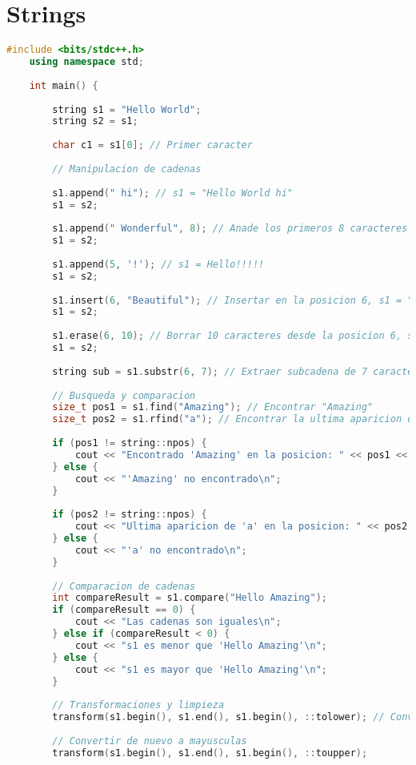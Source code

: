 
\section*{Strings}

\begin{lstlisting}[language=C++]
	#include <bits/stdc++.h>
	using namespace std;
	
	int main() {
		
		string s1 = "Hello World";
		string s2 = s1; 
		
		char c1 = s1[0]; // Primer caracter
		
		// Manipulacion de cadenas
		
		s1.append(" hi"); // s1 = "Hello World hi"
		s1 = s2; 
		
		s1.append(" Wonderful", 8); // Anade los primeros 8 caracteres de la cadena " Wonderful", s1 = "Hello World Wonderf"
		s1 = s2;
		
		s1.append(5, '!'); // s1 = Hello!!!!!
		s1 = s2; 
		
		s1.insert(6, "Beautiful"); // Insertar en la posicion 6, s1 = "Hello BeautifulWorld"
		s1 = s2; 
		
		s1.erase(6, 10); // Borrar 10 caracteres desde la posicion 6, s1 = "Hello "
		s1 = s2; 
		
		string sub = s1.substr(6, 7); // Extraer subcadena de 7 caracteres desde la posicion 6, sub = "World"
		
		// Busqueda y comparacion
		size_t pos1 = s1.find("Amazing"); // Encontrar "Amazing"
		size_t pos2 = s1.rfind("a"); // Encontrar la ultima aparicion de 'a'
		
		if (pos1 != string::npos) {
			cout << "Encontrado 'Amazing' en la posicion: " << pos1 << "\n";
		} else {
			cout << "'Amazing' no encontrado\n";
		}
		
		if (pos2 != string::npos) {
			cout << "Ultima aparicion de 'a' en la posicion: " << pos2 << "\n";
		} else {
			cout << "'a' no encontrado\n";
		}
		
		// Comparacion de cadenas
		int compareResult = s1.compare("Hello Amazing");
		if (compareResult == 0) {
			cout << "Las cadenas son iguales\n";
		} else if (compareResult < 0) {
			cout << "s1 es menor que 'Hello Amazing'\n";
		} else {
			cout << "s1 es mayor que 'Hello Amazing'\n";
		}
		
		// Transformaciones y limpieza
		transform(s1.begin(), s1.end(), s1.begin(), ::tolower); // Convertir a minusculas
		
		// Convertir de nuevo a mayusculas
		transform(s1.begin(), s1.end(), s1.begin(), ::toupper);
		

\end{lstlisting}
